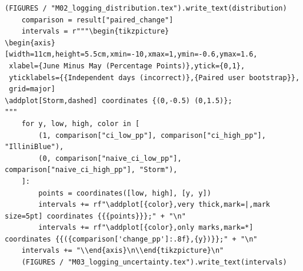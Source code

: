\begin{Verbatim}[breaklines,breakanywhere,fontsize=\small]
    (FIGURES / "M02_logging_distribution.tex").write_text(distribution)
    comparison = result["paired_change"]
    intervals = r"""\begin{tikzpicture}
\begin{axis}[width=11cm,height=5.5cm,xmin=-10,xmax=1,ymin=-0.6,ymax=1.6,
 xlabel={June Minus May (Percentage Points)},ytick={0,1},
 yticklabels={{Independent days (incorrect)},{Paired user bootstrap}},
 grid=major]
\addplot[Storm,dashed] coordinates {(0,-0.5) (0,1.5)};
"""
    for y, low, high, color in [
        (1, comparison["ci_low_pp"], comparison["ci_high_pp"], "IlliniBlue"),
        (0, comparison["naive_ci_low_pp"], comparison["naive_ci_high_pp"], "Storm"),
    ]:
        points = coordinates([low, high], [y, y])
        intervals += rf"\addplot[{color},very thick,mark=|,mark size=5pt] coordinates {{{points}}};" + "\n"
        intervals += rf"\addplot[{color},only marks,mark=*] coordinates {{({comparison['change_pp']:.8f},{y})}};" + "\n"
    intervals += "\\end{axis}\n\\end{tikzpicture}\n"
    (FIGURES / "M03_logging_uncertainty.tex").write_text(intervals)



\end{Verbatim}
